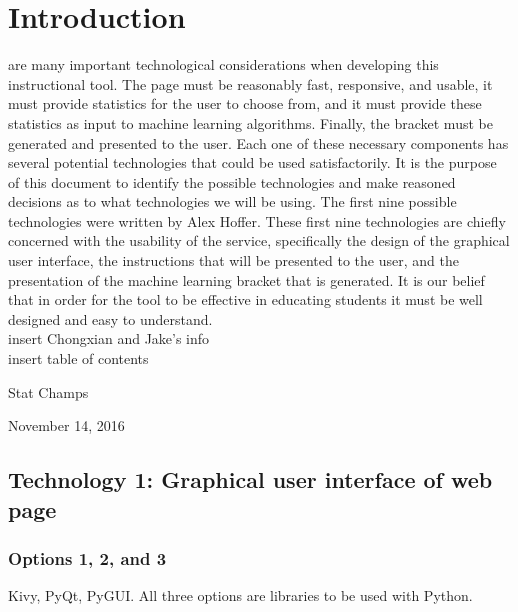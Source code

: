 \documentclass[journal,onecolumn]{IEEEtran}
\begin{document}
\section{Introduction}
% 
% 
% 
% 
 are many important technological considerations when developing this instructional tool. The page must be reasonably fast, responsive, and usable, it must provide statistics for the user to choose from, and it must provide these statistics as input to machine learning algorithms. Finally, the bracket must be generated and presented to the user. Each one of these necessary components has several potential technologies that could be used satisfactorily. It is the purpose of this document to identify the possible technologies and make reasoned decisions as to what technologies we will be using. The first nine possible technologies were written by Alex Hoffer. These first nine technologies are chiefly concerned with the usability of the service, specifically the design of the graphical user interface, the instructions that will be presented to the user, and the presentation of the machine learning bracket that is generated. It is our belief that in order for the tool to be effective in educating students it must be well designed and easy to understand. \\insert Chongxian and Jake's info \\ insert table of contents

\hfill Stat Champs
 
\hfill November 14, 2016

\subsection{Technology 1: Graphical user interface of web page}

\subsubsection{Options 1, 2, and 3}
Kivy, PyQt, PyGUI. All three options are libraries to be used with Python.
\end{document}
